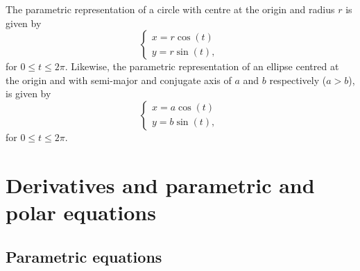 The parametric representation of a circle with centre at the origin and radius $r$ is given by
\begin{equation}
 \left\{\begin{array}{l}
x = r \cos(t) \\ [0.2cm]
y = r \sin(t), 
 \end{array} \right.\,
\end{equation}
for $0 \leq t \leq 2 \pi$. Likewise, the parametric representation of an ellipse centred at the origin and with semi-major and conjugate axis of $a$ and $b$ respectively ($a>b$), is given by
\begin{equation}
\left\{\begin{array}{l}
x = a \cos(t) \\ [0.2cm]
y = b \sin(t),
\end{array} \right.\,
\end{equation}
for $0 \leq t \leq 2 \pi$. 



% 
% 



\section{Derivatives and parametric and polar equations}
\label{sec:deriv_par_polar_eq}
\subsection{Parametric equations}

